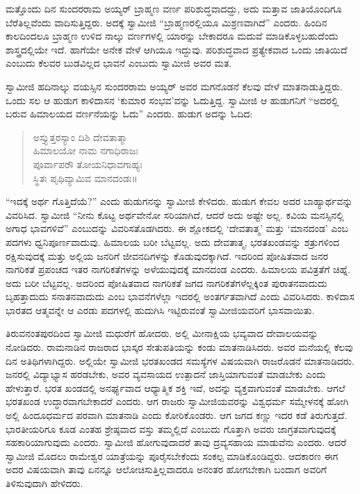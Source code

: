  ಮತ್ತೊಂದು ದಿನ ಸುಂದರರಾಮ ಅಯ್ಯರ್ ಬ್ರಾಹ್ಮಣ ವರ್ಣ ಪರಿಶುದ್ಧವಾದದ್ದು, ಅದು ಮತ್ತಾವ ಜಾತಿಯೊಂದಿಗೂ ಬೆರೆತಿಲ್ಲವೆಂದು ವಾದಿಸುತ್ತಿದ್ದರು. ಅದಕ್ಕೆ ಸ್ವಾಮೀಜಿ “ಬ್ರಾಹ್ಮಣರಲ್ಲಿಯೂ ಮಿಶ್ರಣವಾಗಿದೆ” ಎಂದರು. ಹಿಂದಿನ ಕಾಲದಿಂದಲೂ ಬ್ರಾಹ್ಮಣ ಉಳಿದ ನಾಲ್ಕು ವರ್ಣಗಳಲ್ಲಿ ಯಾರನ್ನು ಬೇಕಾದರೂ ಮದುವೆ ಮಾಡಿಕೊಳ್ಳಬಹುದೆಂದು ಶಾಸ್ತ್ರದಲ್ಲಿಯೇ ಇದೆ. ಹಾಗೆಯೇ ಅನೇಕ ವೇಳೆ ಆಗಿಯೂ ಇದ್ದುವು. ಪರಿಶುದ್ಧವಾದ ಪ್ರತ್ಯೇಕವಾದ ಒಂದು ಜಾತಿಯಿದೆ ಎಂಬುದು ಕೆಲವರ ಬುಡವಿಲ್ಲದ ಭಾವನೆ ಎಂಬುದು ಸ್ವಾಮೀಜಿ ಅವರ ಮತ. 

 ಸ್ವಾಮೀಜಿ ಹದಿನಾಲ್ಕು ವಯಸ್ಸಿನ ಸುಂದರರಾಮ ಅಯ್ಯರ್ ಅವರ ಮಗನೊಡನೆ ಕೆಲವು ವೇಳೆ ಮಾತನಾಡುತ್ತಿದ್ದರು. ಒಂದು ಸಲ ಆ ಹುಡುಗ ಕಾಳಿದಾಸನ ‘ಕುಮಾರ ಸಂಭವ’ವನ್ನು ಓದುತ್ತಿದ್ದ. ಸ್ವಾಮೀಜಿ ಆ ಹುಡುಗನಿಗೆ “ಅದರಲ್ಲಿ ಬರುವ ಹಿಮಾಲಯದ ವರ್ಣನೆಯನ್ನು ಓದು” ಎಂದರು. ಹುಡುಗ ಅದನ್ನು ಓದಿದ:

\begin{verse}
ಅಸ್ತ್ಯುತ್ತರಸ್ಯಾಂ ದಿಶಿ ದೇವತಾತ್ಮಾ\\ಹಿಮಾಲಯೋ ನಾಮ ನಗಾಧಿರಾಜಃ\\ಪೂರ್ವಾಪರೌ ತೋಯನಿಧಾವಗಾಹ್ಯಃ\\ಸ್ಥಿತಃ ಪೃಥಿವ್ಯಾಮಿವ ಮಾನದಂಡಃ॥ 
\end{verse}

 “ಇದಕ್ಕೆ ಅರ್ಥ ಗೊತ್ತಿದೆಯೆ?” ಎಂದು ಹುಡುಗನನ್ನು ಸ್ವಾಮೀಜಿ ಕೇಳಿದರು. ಹುಡುಗ ಕೇವಲ ಅದರ ಬಾಹ್ಯಾರ್ಥವನ್ನು ವಿವರಿಸಿದ. ಸ್ವಾಮೀಜಿ “ನೀನು ಕೊಟ್ಟ ಅರ್ಥವೇನೋ ಸರಿಯಾಗಿದೆ, ಆದರೆ ಅದು ಅಷ್ಟೇ ಅಲ್ಲ. ಕವಿಯ ಮನಸ್ಸಿನಲ್ಲಿ ಅಗಾಧ ಭಾವಗಳಿವೆ” ಎಂಬುದನ್ನು ವಿವರಿಸತೊಡಗಿದರು. ಈ ಶ್ಲೋಕದಲ್ಲಿ ‘ದೇವತಾತ್ಮ’ ಮತ್ತು ‘ಮಾನದಂಡ’ ಎಂಬ ಪದಗಳು ಧ್ವನಿಪೂರ್ಣವಾದುವು. ಹಿಮಾಲಯ ಬರೀ ಬೆಟ್ಟವಲ್ಲ. ಅದು ದೇವತಾತ್ಮ, ಭರತಖಂಡವನ್ನು ಶತ್ರುಗಳಿಂದ ರಕ್ಷಿಸುವುದಕ್ಕೆ ಮತ್ತು ಅಲ್ಲಿಯ ಜನರಿಗೆ ಜೀವನದಿಗಳನ್ನು ಕೊಡುವುದಕ್ಕಾಗಿದೆ. ಇದರಿಂದ ಪೋಷಿತವಾದ ಜನರ ನಾಗರಿಕತೆ ಪ್ರಪಂಚದ ಇತರ ನಾಗರಿಕತೆಗಳನ್ನು ಅಳೆಯುವುದಕ್ಕೆ ಮಾನದಂಡ ಎಂದರು. ಹಿಮಾಲಯ ಪವಿತ್ರತೆಗೆ ಚಿಹ್ನೆ. ಅದು ಬರೀ ಬೆಟ್ಟವಲ್ಲ. ಅದರಿಂದ ಪೋಷಿತವಾದ ನಾಗರಿಕತೆ ಜಗದ ನಾಗರಿಕತೆಗಳೆಲ್ಲಕ್ಕಿಂತ ಪುರಾತನವಾದುದು ಬೃಹತ್ತಾದುದು ಸನಾತನವಾದುದು ಎಂಬ ಭಾವನೆಗಳೆಲ್ಲಾ ಇದರಲ್ಲಿ ಅಂತರ್ಗತವಾಗಿದೆ ಎಂದು ವಿವರಿಸಿದರು. ಕಾಳಿದಾಸ ಭಾರತದ ಆತ್ಮವನ್ನೇ ಆ ಎರಡು ಪದಗಳಲ್ಲಿ ಹುದುಗಿಸಿ ಇಟ್ಟಿರುವಂತೆ ಸ್ವಾಮೀಜಿಯವರಿಗೆ ಭಾಸವಾಯಿತು. 

 ತಿರುವನಂತಪುರದಿಂದ ಸ್ವಾಮೀಜಿ ಮಧುರೆಗೆ ಹೋದರು. ಅಲ್ಲಿ ಮೀನಾಕ್ಷಿಯ ಭವ್ಯವಾದ ದೇವಾಲಯವನ್ನು ನೋಡಿದರು. ರಾಮನಾಡಿನ ರಾಜರಾದ ಭಾಸ್ಕರ ಸೇತುಪತಿಯನ್ನು ಕಂಡು ಮಾತನಾಡಿಸಿದರು. ಅವರ ಮನೆಯಲ್ಲಿ ಕೆಲವು ದಿನ ಅತಿಥಿಗಳಾಗಿದ್ದರು. ಅಲ್ಲಿಯೇ ಸ್ವಾಮೀಜಿ ಭರತಖಂಡದ ಸಮಸ್ಯೆಗಳ ವಿಷಯವಾಗಿ ರಾಜರೊಡನೆ ಮಾತನಾಡಿದರು. ಜನರಲ್ಲಿ ವಿದ್ಯಾಭ್ಯಾಸ ಹರಡಬೇಕು, ಅವರ ವ್ಯವಸಾಯದ ಉತ್ಪಾದನೆ ಜಾಸ್ತಿಯಾಗುವಂತೆ ಮಾಡಬೇಕು ಎಂದು ಹೇಳುತ್ತಾರೆ. ಭರತ ಖಂಡದಲ್ಲಿ ಅನರ್ಘ್ಯವಾದ ಆಧ್ಯಾತ್ಮಿಕ ಶಕ್ತಿ ಇದೆ, ಅದನ್ನು ವ್ಯಕ್ತವಾಗುವಂತೆ ಮಾಡಬೇಕು. ಆಗಲೆ ಭರತಖಂಡ ಉದ್ಧಾರವಾಗಬೇಕಾದರೆ ಎಂದರು. ಆಗ ರಾಜರು ಸ್ವಾಮೀಜಿಯವರನ್ನು ವಿಶ್ವಧರ್ಮ ಸಮ್ಮೇಳನಕ್ಕೆ ಹೋಗಿ ಅಲ್ಲಿ ಹಿಂದೂಧರ್ಮದ ಪರವಾಗಿ ಮಾತನಾಡಿ ಎಂದು ಕೋರಿಕೊಂಡರು. ಆಗ ಜಗದ ಕಣ್ಣು ಇದರ ಕಡೆ ತಿರುಗುತ್ತದೆ. ಭಾರತೀಯರಿಗೂ ಕೂಡ ಎಂತಹ ಶ್ರೇಷ್ಠವಾದ ವಸ್ತು ತಮ್ಮಲ್ಲಿದೆ ಎಂಬುದು ಗೊತ್ತಾಗಿ ಅವರು ಜಾಗ್ರತವಾಗುವುದಕ್ಕೆ ಸಹಕಾರಿಯಾಗುವುದು ಎಂದರು. ಸ್ವಾಮೀಜಿ ಹೋಗುವುದಾದರೆ ತಾವು ದ್ರವ್ಯಸಹಾಯ ಮಾಡುವೆನು ಎಂದರು. ಆದರೆ ಸ್ವಾಮೀಜಿ ಮೊದಲು ರಾಮೇಶ್ವರ ಯಾತ್ರೆಯನ್ನು ಪೂರೈಸಬೇಕೆಂದು ಸಂಕಲ್ಪ ಮಾಡಿಕೊಂಡಿದ್ದರು. ಆದಕಾರಣ ಈಗ ಅದರ ವಿಷಯವಾಗಿ ತಾವು ಏನನ್ನೂ ಆಲೋಚಿಸುತ್ತಿಲ್ಲವಾದರೂ ಅನಂತರ ಹೋಗಬೇಕಾಗಿ ಬಂದಾಗ ಅವರಿಗೆ ತಿಳಿಸುವುದಾಗಿ ಹೇಳಿದರು. 

